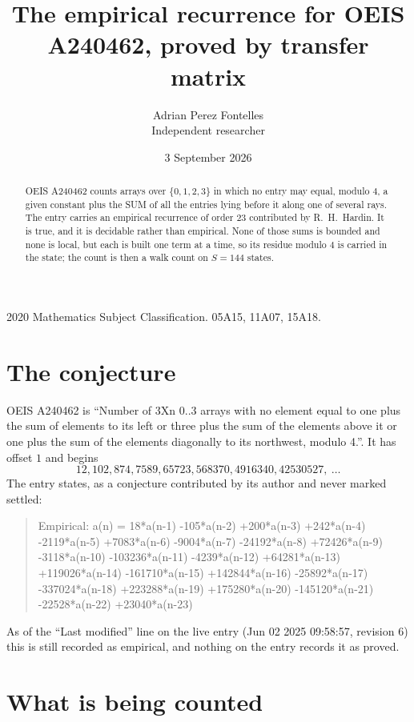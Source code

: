 \documentclass[11pt,a4paper]{article}
\title{The empirical recurrence for OEIS A240462, proved by transfer matrix}
\author{Adrian Perez Fontelles\\ \small Independent researcher}
\date{3 September 2026}
\theoremstyle{plain}
\theoremstyle{definition}
\begin{document}
\maketitle

\begin{abstract}
OEIS A240462 counts arrays over $\{0,1,2,3\}$ in which no entry may equal, modulo $4$, a given
constant plus the SUM of all the entries lying before it along one of several rays. The entry
carries an empirical recurrence of order $23$ contributed by R.~H.~Hardin. It is true, and
it is decidable rather than empirical. None of those sums is bounded and none is local, but
each is built one term at a time, so its residue modulo $4$ is carried in the state; the
count is then a walk count on $S=144$ states.
\end{abstract}

\noindent\small 2020 Mathematics Subject Classification. 05A15, 11A07, 15A18.\normalsize

\section{The conjecture}

OEIS A240462 is ``Number of 3Xn 0..3 arrays with no element equal to one plus the sum of elements to its left or three plus the sum of the elements above it or one plus the sum of the elements diagonally to its northwest, modulo 4.''. It has offset $1$ and begins
\[
12, 102, 874, 7589, 65723, 568370, 4916340, 42530527,\ \dots
\]
The entry states, as a conjecture contributed by its author and never marked settled:
\begin{quote}
Empirical: a(n) = 18*a(n-1) -105*a(n-2) +200*a(n-3) +242*a(n-4) -2119*a(n-5) +7083*a(n-6) -9004*a(n-7) -24192*a(n-8) +72426*a(n-9) -3118*a(n-10) -103236*a(n-11) -4239*a(n-12) +64281*a(n-13) +119026*a(n-14) -161710*a(n-15) +142844*a(n-16) -25892*a(n-17) -337024*a(n-18) +223288*a(n-19) +175280*a(n-20) -145120*a(n-21) -22528*a(n-22) +23040*a(n-23)
\end{quote}
As of the ``Last modified'' line on the live entry (Jun 02 2025 09:58:57, revision 6) this is still
recorded as empirical, and nothing on the entry records it as proved.

\section{What is being counted}
\end{document}
